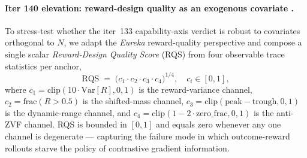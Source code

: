 \paragraph{Iter 140 elevation: reward-design quality as an exogenous
covariate \citep{ma2024eureka}.}
\label{par:scaling-iter140-eureka}

To stress-test whether the iter~133 capability-axis verdict is robust
to covariates orthogonal to $N$, we adapt the \emph{Eureka}
reward-quality perspective \citep{ma2024eureka} and compose a single
scalar \emph{Reward-Design Quality Score} (RQS) from four observable
trace statistics per anchor,
\begin{equation}
  \label{eq:iter140-rqs}
  \mathrm{RQS} \;=\;
  \bigl(c_1 \cdot c_2 \cdot c_3 \cdot c_4\bigr)^{1/4},
  \quad c_i \in [0, 1],
\end{equation}
where $c_1 = \mathrm{clip}(10 \cdot \mathrm{Var}[R], 0, 1)$ is the
reward-variance channel, $c_2 = \mathrm{frac}(R > 0.5)$ is the
shifted-mass channel, $c_3 = \mathrm{clip}(\mathrm{peak} - \mathrm{trough}, 0, 1)$
is the dynamic-range channel, and $c_4 = \mathrm{clip}(1 - 2 \cdot \mathrm{zero\_frac}, 0, 1)$
is the anti-ZVF channel.  RQS is bounded in $[0, 1]$ and equals
zero whenever any one channel is degenerate --- capturing the failure
mode in which outcome-reward rollouts starve the policy of
contrastive gradient information.

